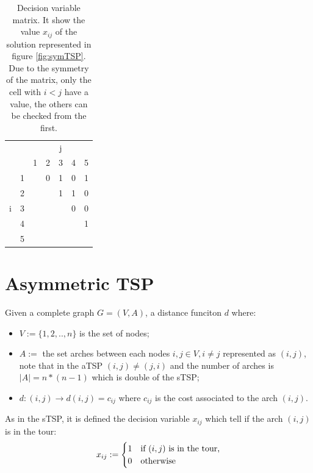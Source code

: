 \begin{table}[h!]
	\begin{center}
		\caption{Decision variable matrix. It show the value $ x_{ij} $ of the solution represented in figure \ref{fig:symTSP}. Due to the symmetry of the matrix, only the cell with $ i < j $ have a value, the others can be checked from the first.}
		\label{tab:symTSP_solution}
		\begin{tabular}{cc|c|c|c|c|c|}
			 \multicolumn{2}{c}{} & \multicolumn{5}{c}{j} \\ %
			& \multicolumn{1}{c}{} & \multicolumn{1}{c}{1} & \multicolumn{1}{c}{2} & \multicolumn{1}{c}{3} & \multicolumn{1}{c}{4} & \multicolumn{1}{c}{5} \\ \cline{3-7}
			\multirow{5}{*}{i} 	& 1 & \cellcolor{Black} & 0 & 1 & 0 & 1 \\ \cline{3-7}
								& 2 &  & \cellcolor{Black} & 1 & 1 & 0 \\ \cline{3-7}
								& 3 &  &  & \cellcolor{Black} & 0 & 0 \\ \cline{3-7}
								& 4 &  &  &  & \cellcolor{Black} & 1 \\ \cline{3-7}
								& 5 &  &  &  &  & \cellcolor{Black} \\ \cline{3-7}
		\end{tabular}
	\end{center}
\end{table}



\section{Asymmetric TSP}
Given a complete graph $ G = (V,A) $, a distance funciton  $ d $ where:
\begin{itemize}
	\item $ V:= \{1, 2, .., n\} $ is the set of nodes;
	\item $ A := $ the set arches between each nodes $ i,j \in V, i \ne j$ represented as $ (i,j) $, note that in the aTSP $ (i,j) \ne (j,i) $ and the number of arches is $ |A| = n \ast (n-1) $ which is double of the sTSP;
	\item $ d: (i,j) \rightarrow d(i,j) = c_{ij} $ where $ c_{ij} $ is the cost associated to the arch $ (i,j) $.
\end{itemize}
As in the sTSP, it is defined the decision variable $ x_{ij} $ which tell if the arch $ (i,j) $ is in the tour:
\[
x_{ij} := \begin{cases}
1 & \text{if $ (i,j) $ is in the tour,} \\
0 & \text{otherwise}
\end{cases}
\]

